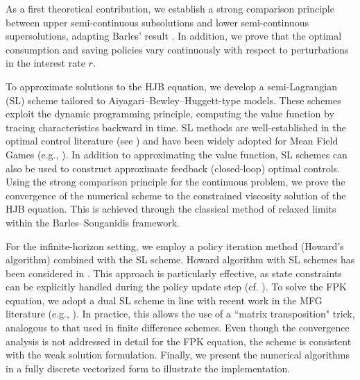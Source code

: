 \documentclass[11pt]{article}
\numberwithin{equation}{section}
\theoremstyle{Claim}
\theoremstyle{plain}
\begin{document}
As a first theoretical contribution, we establish a strong comparison principle between upper semi-continuous subsolutions and lower semi-continuous supersolutions, adapting Barles' result \cite[Theorem 4.6]{barles1994solutions}. In addition, we prove that the optimal consumption and saving policies vary continuously with respect to perturbations in the interest rate $r$.

To approximate solutions to the HJB equation, we develop a semi-Lagrangian (SL) scheme tailored to Aiyagari–Bewley–Huggett-type models. These schemes exploit the dynamic programming principle, computing the value function by tracing characteristics backward in time. SL methods are well-established in the optimal control literature (see \cite{achdou2008homogenization, alla2015efficient, bardi1997optimal,briani2012approximation,calzola2023semi,carlini2024lagrange, Chen_2008,falcone2013semi,festa2018domain}) and have been widely adopted for Mean Field Games (e.g., \cite{ashrafyan2025fully,CALZOLA2024115769, carlini2014fully, MR3392626, chowdhury2023numerical}). In addition to approximating the value function, SL schemes can also be used to construct approximate feedback (closed-loop) optimal controls. Using the strong comparison principle for the continuous problem, we prove the convergence of the numerical scheme to the constrained viscosity solution of the HJB equation. This is achieved through the classical method of relaxed limits within the Barles–Souganidis framework.

For the infinite-horizon setting, we employ a policy iteration method (Howard's algorithm) combined with the SL scheme. Howard algorithm with SL schemes has been considered in \cite{alla2015efficient,festa2018domain}. This approach is particularly effective, as state constraints can be explicitly handled during the policy update step (cf. \cite[Eq. (3.2)]{achdou2022simulating}). To solve the FPK equation, we adopt a dual SL scheme in line with recent work in the MFG literature (e.g., \cite{ashrafyan2025fully, carlini2014fully, chowdhury2023numerical}). In practice, this allows the use of a ``matrix transposition" trick, analogous to that used in finite difference schemes. Even though the convergence analysis is not addressed in detail for the FPK equation, the scheme is consistent with the weak solution formulation. Finally, we present the numerical algorithms in a fully discrete vectorized form to illustrate the implementation.\par
\end{document}

